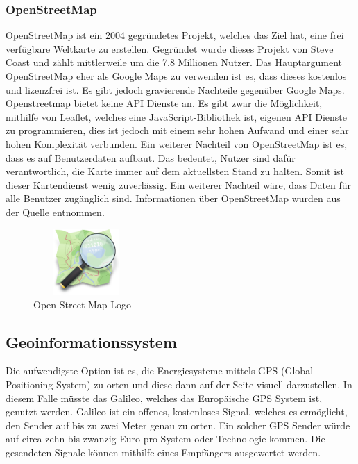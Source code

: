 \subsubsection{OpenStreetMap}\label{sec:OpenStreetMap}


OpenStreetMap ist ein 2004 gegründetes Projekt, welches das Ziel hat, eine frei verfügbare Weltkarte zu erstellen. Gegründet wurde dieses Projekt von Steve Coast und zählt mittlerweile um die 7.8 Millionen Nutzer. Das Hauptargument OpenStreetMap eher als Google Maps zu verwenden ist es, dass dieses kostenlos und lizenzfrei ist. Es gibt jedoch gravierende Nachteile gegenüber Google Maps. Openstreetmap bietet keine API Dienste an. Es gibt zwar die Möglichkeit, mithilfe von Leaflet, welches eine JavaScript-Bibliothek ist, eigenen API Dienste zu programmieren, dies ist jedoch mit einem sehr hohen Aufwand und einer sehr hohen Komplexität verbunden. Ein weiterer Nachteil von OpenStreetMap ist es, dass es auf Benutzerdaten aufbaut. Das bedeutet, Nutzer sind  dafür verantwortlich, die Karte immer auf dem aktuellsten Stand zu halten. Somit ist dieser Kartendienst wenig zuverlässig.
Ein weiterer Nachteil wäre, dass Daten für alle Benutzer zugänglich sind. Informationen über OpenStreetMap wurden aus der Quelle  \cite{OpenStreetMap} entnommen.
\begin{figure}[h]
	\centering
	\includegraphics[height=2.5cm,width=4cm]{images/OpenStreetMap_Logo}
	\caption{Open Street Map Logo}
	\label{fig:Open Street Map Logo}
\end{figure}


\newpage

\subsection{Geoinformationssystem }
Die aufwendigste Option ist es, die Energiesysteme mittels GPS (Global Positioning System) zu orten und diese dann auf der Seite visuell darzustellen. In diesem Falle müsste das Galileo, welches das Europäische GPS System ist, genutzt werden. Galileo ist ein offenes, kostenloses Signal, welches es ermöglicht, den Sender auf bis zu zwei Meter genau zu orten. Ein solcher GPS Sender würde auf circa zehn bis zwanzig Euro pro System oder Technologie kommen. Die gesendeten Signale können mithilfe eines Empfängers ausgewertet werden.

